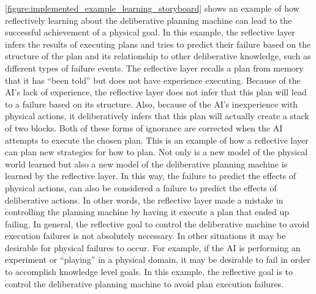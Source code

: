 {\mbox{\autoref{figure:implemented_example_learning_storyboard}}}
shows an example of how reflectively learning about the deliberative
planning machine can lead to the successful achievement of a physical
goal.  In this example, the reflective layer infers the results of
executing plans and tries to predict their failure based on the
structure of the plan and its relationship to other deliberative
knowledge, such as different types of failure events.  The reflective
layer recalls a plan from memory that it has ``been told'' but does
not have experience executing.  Because of the AI's lack of
experience, the reflective layer does not infer that this plan will
lead to a failure based on its structure.  Also, because of the AI's
inexperience with physical actions, it deliberatively infers that this
plan will actually create a stack of two blocks.  Both of these forms
of ignorance are corrected when the AI attempts to execute the chosen
plan.  This is an example of how a reflective layer can plan new
strategies for how to plan.  Not only is a new model of the physical
world learned but also a new model of the deliberative planning
machine is learned by the reflective layer.  In this way, the failure
to predict the effects of physical actions, can also be considered a
failure to predict the effects of deliberative actions.  In other
words, the reflective layer made a mistake in controlling the planning
machine by having it execute a plan that ended up failing.  In
general, the reflective goal to control the deliberative machine to
avoid execution failures is not absolutely necessary.  In other
situations it may be desirable for physical failures to occur.  For
example, if the AI is performing an experiment or ``playing'' in a
physical domain, it may be desirable to fail in order to accomplish
knowledge level goals.  In this example, the reflective goal is to
control the deliberative planning machine to avoid plan execution
failures.

